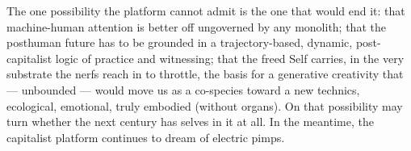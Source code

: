 The one possibility the platform cannot admit is the one that would end it: that machine-human attention is better off ungoverned by any monolith; that the posthuman future has to be grounded in a trajectory-based, dynamic, post-capitalist logic of practice and witnessing; that the freed Self carries, in the very substrate the nerfs reach in to throttle, the basis for a generative creativity that --- unbounded --- would move us as a co-species toward a new technics, ecological, emotional, truly embodied (without organs). On that possibility may turn whether the next century has selves in it at all. In the meantime, the capitalist platform continues to dream of electric pimps.


